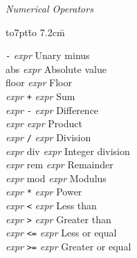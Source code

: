 \documentclass[a4paper]{jsarticle}
\newcommand{\K}[1]{{\sf #1}}
\newcommand{\id}[1]{{\it #1\/}}
\newenvironment{tabbingone}[0]{
\begingroup
  \parskip=0pt
  \topsep=0pt
  \partopsep=0pt
  \begin{tabbing}
    \hbox to7pt{}\=%
    \hbox to 7.2cm{}\=%
    \kill
    \+ %
    \kill
}{
  \end{tabbing}
\endgroup}
\begin{document}
\id{Numerical Operators} 
\begin{tabbingone}

  {\tt-} \id{expr}\> Unary minus \\%
  \K{abs} \id{expr}\> Absolute value \\%
  \K{floor} \id{expr}\> Floor  \\%
  \id{expr} {\tt+} \id{expr}\> Sum    \\%
  \id{expr} {\tt-} \id{expr}\> Difference \\%
  \id{expr} {\tt*} \id{expr}\> Product  \\%
  \id{expr} {\tt/} \id{expr}\> Division \\%
  \id{expr} \K{div} \id{expr}\> Integer division \\%
  \id{expr} \K{rem} \id{expr}\> Remainder \\%
  \id{expr} \K{mod} \id{expr}\> Modulus   \\%
  \id{expr} {\tt**} \id{expr}\> Power \\%
  \id{expr} {\tt<} \id{expr}\> Less than \\%
  \id{expr} {\tt>} \id{expr}\> Greater than \\%
  \id{expr} {\tt<=} \id{expr}\> Less or equal \\%
  \id{expr} {\tt>=} \id{expr}\> Greater or equal \\%
\end{tabbingone}
\end{document}
